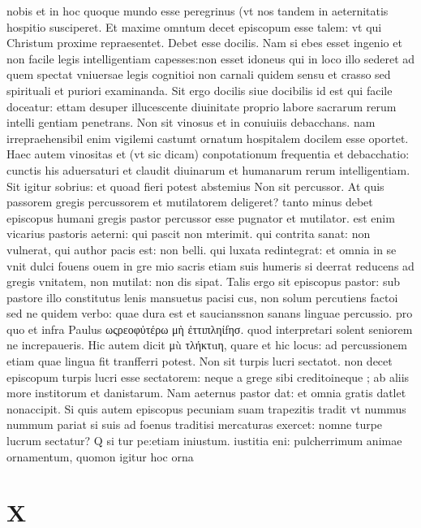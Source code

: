 \documentclass{article}
\begin{document}
\begin{pages}
nobis et in hoc quoque  mundo esse peregrinus (vt nos tandem in aeternitatis hospitio susciperet. Et maxime omntum decet episcopum esse talem: vt qui Christum proxime repraesentet. Debet esse docilis. Nam si ebes esset ingenio et non facile legis intelligentiam capesses:non esset idoneus qui in loco illo sederet ad quem spectat vniuersae legis cognitioi non carnali quidem sensu et crasso sed spirituali et puriori examinanda. Sit ergo docilis siue docibilis id est qui facile doceatur: ettam desuper illucescente diuinitate proprio labore sacrarum rerum intelli gentiam penetrans. Non sit vinosus et in conuiuiis debacchans. nam irrepraehensibil enim vigilemi castumt ornatum hospitalem docilem esse oportet. Haec autem vinositas et (vt sic dicam) conpotationum frequentia et debacchatio: cunctis his aduersaturi et claudit diuinarum et humanarum rerum intelligentiam. Sit igitur sobrius: et quoad fieri potest abstemius Non sit percussor. At quis passorem gregis percussorem et mutilatorem deligeret? tanto minus debet episcopus humani gregis pastor percussor esse pugnator et mutilator. est enim vicarius pastoris aeterni: qui pascit non mterimit. qui contrita sanat: non vulnerat, qui author pacis est: non belli. qui luxata redintegrat: et omnia in se vnit dulci fouens ouem in gre mio sacris etiam suis humeris si deerrat reducens ad gregis vnitatem, non mutilat: non dis sipat. Talis ergo sit episcopus pastor: sub pastore illo constitutus lenis mansuetus pacisi cus, non solum percutiens factoi sed ne quidem verbo: quae dura est et saucianssnon sanans linguae percussio. pro quo et infra Paulus ωςρεοφὐτέρω μὴ ἐττιπληίfησ. quod interpretari solent seniorem ne increpaueris. Hic autem dicit μù τλήκτuη, quare et hic locus: ad percussionem etiam quae lingua fit tranfferri potest. Non sit turpis lucri sectatot. non decet episcopum turpis lucri esse sectatorem: neque a grege sibi creditoineque ; ab aliis more institorum et danistarum. Nam aeternus pastor dat: et omnia gratis datlet nonaccipit. Si quis autem episcopus pecuniam suam trapezitis tradit vt nummus nummum pariat si suis ad foenus traditisi mercaturas exercet: nomne turpe lucrum sectatur? Q si tur pe:etiam iniustum. iustitia eni: pulcherrimum animae ornamentum, quomon igitur hoc orna\pend
\section*{X }

\end{pages}
\end{document}
